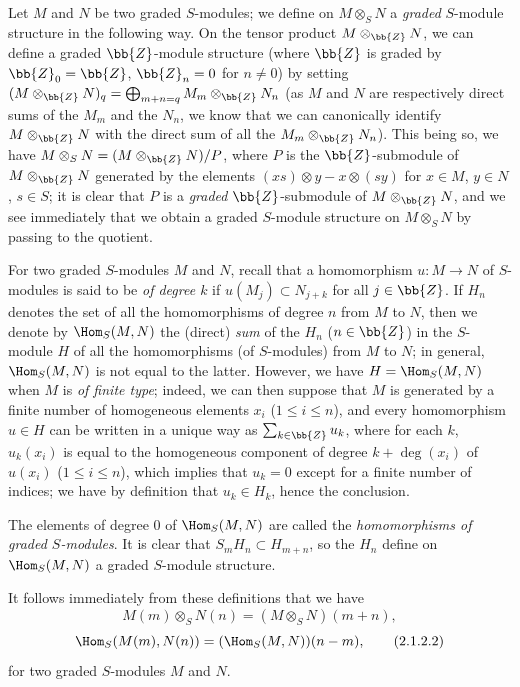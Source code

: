 \begin{env}[2.1.2]
\label{II.2.1.2}
Let $M$ and $N$ be two graded $S$-modules;
we define on $M\otimes_S N$ a \emph{graded} $S$-module structure in the following way.
On the tensor product $M\otimes_\bb{Z}N$, we can define a graded $\bb{Z}$-module structure (where $\bb{Z}$ is graded by $\bb{Z}_0=\bb{Z}$, $\bb{Z}_n=0$ for $n\neq 0$) by setting $(M\otimes_\bb{Z}N)_q=\bigoplus_{m+n=q}M_m\otimes_\bb{Z}N_n$ (as $M$ and $N$ are respectively direct sums of the $M_m$ and the $N_n$, we know that we can canonically identify $M\otimes_\bb{Z}N$ with the direct sum of all the $M_m\otimes_\bb{Z}N_n$).
This being so, we have $M\otimes_S N=(M\otimes_\bb{Z}N)/P$, where $P$ is the $\bb{Z}$-submodule of $M\otimes_\bb{Z}N$ generated by the elements $(xs)\otimes y-x\otimes(sy)$ for $x\in M$, $y\in N$, $s\in S$;
it is clear that $P$ is a \emph{graded} $\bb{Z}$-submodule of $M\otimes_\bb{Z}N$, and we see immediately that we obtain a graded $S$-module structure on $M\otimes_S N$ by passing to the quotient.

For two graded $S$-modules $M$ and $N$, recall that a homomorphism $u:M\to N$ of $S$-modules is said to be \emph{of degree $k$} if $u(M_j)\subset N_{j+k}$ for all $j\in\bb{Z}$.
If $H_n$ denotes the set of all the homomorphisms of degree $n$ from $M$ to $N$, then we denote by $\Hom_S(M,N)$ the (direct) \emph{sum} of the $H_n$ ($n\in\bb{Z}$) in the $S$-module $H$ of all the homomorphisms (of $S$-modules) from $M$ to $N$;
in general, $\Hom_S(M,N)$ is not equal to the latter.
However, we have $H=\Hom_S(M,N)$ when $M$ is \emph{of finite type};
indeed, we can then suppose that $M$ is generated by a finite number of homogeneous elements $x_i$ ($1\leq i\leq n$), and every homomorphism $u\in H$ can be written in a unique way as $\sum_{k\in\bb{Z}}u_k$, where for each $k$, $u_k(x_i)$ is equal to the homogeneous component of degree $k+\deg(x_i)$ of $u(x_i)$ ($1\leq i\leq n$), which implies that $u_k=0$ except for a finite number of indices;
we have by definition that $u_k\in H_k$, hence the conclusion.

The elements of degree $0$ of $\Hom_S(M,N)$ are called the \emph{homomorphisms of graded $S$-modules}.
It is clear that $S_m H_n\subset H_{m+n}$, so the $H_n$ define on $\Hom_S(M,N)$ a graded $S$-module structure.

It follows immediately from these definitions that we have
\[
\label{II.2.1.2.1}
  M(m)\otimes_S N(n)=(M\otimes_S N)(m+n),
\tag{2.1.2.1}
\]
\[
\label{II.2.1.2.2}
  \Hom_S(M(m),N(n))=(\Hom_S(M,N))(n-m),
\tag{2.1.2.2}
\]
for two graded $S$-modules $M$ and $N$.


\end{env}
